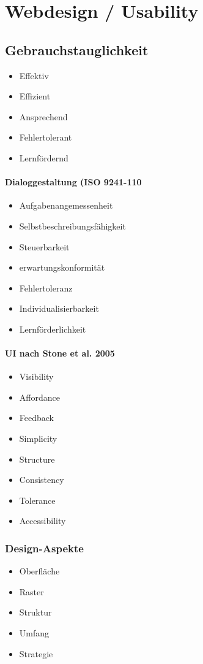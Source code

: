 \section{Webdesign / Usability}
\begin{multicols}{2}
\subsection{Gebrauchstauglichkeit}

\begin{itemize}
\item Effektiv
\item Effizient
\item Ansprechend
\item Fehlertolerant
\item Lernfördernd
\end{itemize}

\paragraph{Dialoggestaltung (ISO 9241-110}
\begin{itemize}
	\item Aufgabenangemessenheit
	\item Selbstbeschreibungsfähigkeit
	\item Steuerbarkeit
	\item erwartungskonformität
	\item Fehlertoleranz
	\item Individualisierbarkeit
	\item Lernförderlichkeit
\end{itemize}

\paragraph{UI nach Stone et al. 2005}

\begin{itemize}
	\item Visibility
	\item Affordance
	\item Feedback
	\item Simplicity
	\item Structure
	\item Consistency
	\item Tolerance
	\item Accessibility
\end{itemize}


\subsubsection{Design-Aspekte}
\begin{itemize}
	\item Oberfläche
	\item Raster
	\item Struktur
	\item Umfang
	\item Strategie
\end{itemize}
\end{multicols}

